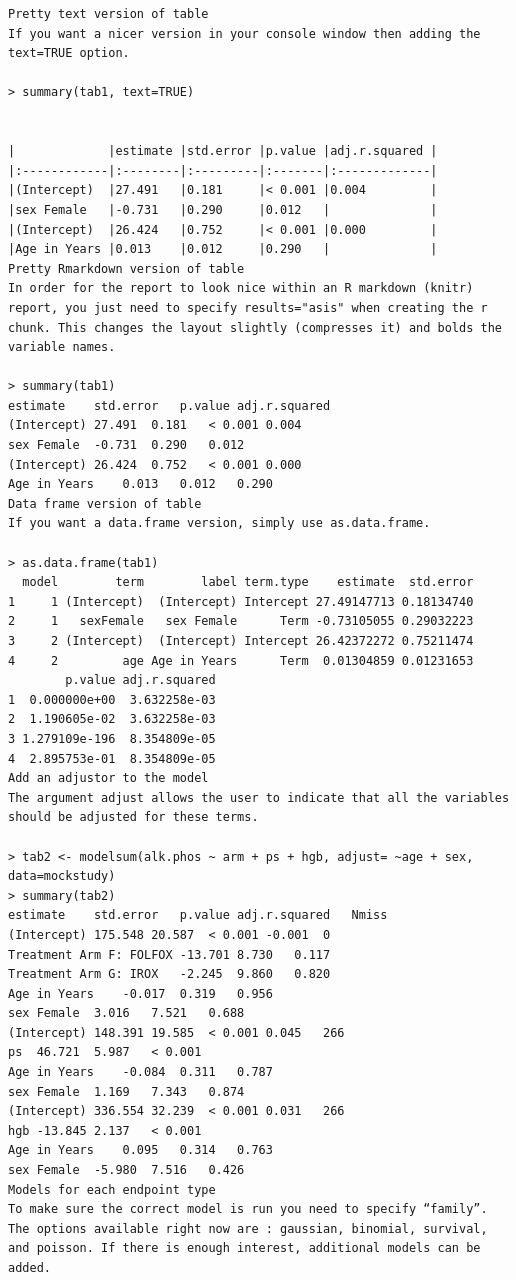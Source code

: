\documentclass[
]{book}
\begin{document}
\begin{verbatim}
Pretty text version of table
If you want a nicer version in your console window then adding the text=TRUE option.

> summary(tab1, text=TRUE)


|             |estimate |std.error |p.value |adj.r.squared |
|:------------|:--------|:---------|:-------|:-------------|
|(Intercept)  |27.491   |0.181     |< 0.001 |0.004         |
|sex Female   |-0.731   |0.290     |0.012   |              |
|(Intercept)  |26.424   |0.752     |< 0.001 |0.000         |
|Age in Years |0.013    |0.012     |0.290   |              |
Pretty Rmarkdown version of table
In order for the report to look nice within an R markdown (knitr) report, you just need to specify results="asis" when creating the r chunk. This changes the layout slightly (compresses it) and bolds the variable names.

> summary(tab1)
estimate    std.error   p.value adj.r.squared
(Intercept) 27.491  0.181   < 0.001 0.004
sex Female  -0.731  0.290   0.012   
(Intercept) 26.424  0.752   < 0.001 0.000
Age in Years    0.013   0.012   0.290   
Data frame version of table
If you want a data.frame version, simply use as.data.frame.

> as.data.frame(tab1)
  model        term        label term.type    estimate  std.error
1     1 (Intercept)  (Intercept) Intercept 27.49147713 0.18134740
2     1   sexFemale   sex Female      Term -0.73105055 0.29032223
3     2 (Intercept)  (Intercept) Intercept 26.42372272 0.75211474
4     2         age Age in Years      Term  0.01304859 0.01231653
        p.value adj.r.squared
1  0.000000e+00  3.632258e-03
2  1.190605e-02  3.632258e-03
3 1.279109e-196  8.354809e-05
4  2.895753e-01  8.354809e-05
Add an adjustor to the model
The argument adjust allows the user to indicate that all the variables should be adjusted for these terms.

> tab2 <- modelsum(alk.phos ~ arm + ps + hgb, adjust= ~age + sex, data=mockstudy)
> summary(tab2)
estimate    std.error   p.value adj.r.squared   Nmiss
(Intercept) 175.548 20.587  < 0.001 -0.001  0
Treatment Arm F: FOLFOX -13.701 8.730   0.117       
Treatment Arm G: IROX   -2.245  9.860   0.820       
Age in Years    -0.017  0.319   0.956       
sex Female  3.016   7.521   0.688       
(Intercept) 148.391 19.585  < 0.001 0.045   266
ps  46.721  5.987   < 0.001     
Age in Years    -0.084  0.311   0.787       
sex Female  1.169   7.343   0.874       
(Intercept) 336.554 32.239  < 0.001 0.031   266
hgb -13.845 2.137   < 0.001     
Age in Years    0.095   0.314   0.763       
sex Female  -5.980  7.516   0.426       
Models for each endpoint type
To make sure the correct model is run you need to specify “family”. The options available right now are : gaussian, binomial, survival, and poisson. If there is enough interest, additional models can be added.


\end{verbatim}
\end{document}

